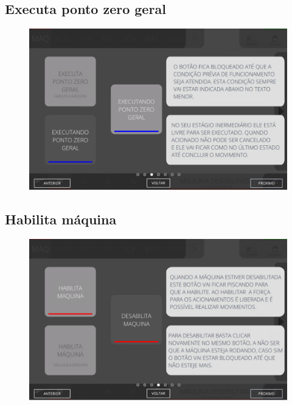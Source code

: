 \newpage
\thispagestyle{fancy}
\vspace*{40 pt}
\subsection{Executa ponto zero geral}
\vspace*{\fill}
\begin{figure}[h]
    \centering
    \includegraphics[width=576 px,height=360 px]{src/imagesICV/02-machine/4.png}
\end{figure}
\vspace*{\fill}

\newpage
\thispagestyle{fancy}
\vspace*{40 pt}
\subsection{Habilita máquina}
\vspace*{\fill}
\begin{figure}[h]
    \centering
    \includegraphics[width=576 px,height=360 px]{src/imagesICV/02-machine/5.png}
\end{figure}
\vspace*{\fill}

